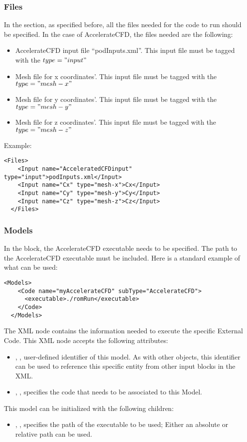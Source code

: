 \subsubsection{Files}
In the  section, as specified before, all the files needed
for the code to run should be specified. In the case of AccelerateCFD,
 the files needed are the following:
\begin{itemize}
  \item AccelerateCFD input file ``podInputs.xml''. This input file must be tagged with
          the $type="input"$
  \item Mesh file for x coordinates'. This input file must be tagged with
          the $type="mesh-x"$
  \item Mesh file for y coordinates'. This input file must be tagged with
          the $type="mesh-y"$
  \item Mesh file for z coordinates'. This input file must be tagged with
          the $type="mesh-z"$
\end{itemize}
%
Example:
\begin{lstlisting}[style=XML]
  <Files>
    <Input name="AcceleratedCFDinput" type="input">podInputs.xml</Input>
    <Input name="Cx" type="mesh-x">Cx</Input>
    <Input name="Cy" type="mesh-y">Cy</Input>
    <Input name="Cz" type="mesh-z">Cz</Input>
  </Files>
\end{lstlisting}

\subsubsection{Models}
In the  block, the AccelerateCFD executable needs to be specified.
The  path to the AccelerateCFD executable must be included.
 Here is a standard example of what can be used:
\begin{lstlisting}[style=XML]
  <Models>
    <Code name="myAccelerateCFD" subType="AccelerateCFD">
      <executable>./romRun</executable>
    </Code>
  </Models>
\end{lstlisting}

The  XML node contains the information needed to execute the specific External Code. This
XML node accepts the following attributes:
\begin{itemize}
  \item {}, , user-defined identifier of this model.
    \nb As with other objects, this identifier can be used to reference this specific entity from other input
    blocks in the XML.
  \item {}, , specifies the code that needs to be
    associated to this Model.
\end{itemize}
This model can be initialized with the following children:
\begin{itemize}
  \item {}, , specifies the path of the executable to
    be used; \nb Either an absolute or relative path can be used.
\end{itemize}


